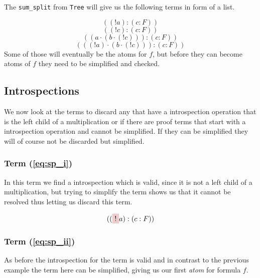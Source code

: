 

The \texttt{sum\_split} from \texttt{Tree} will give us the following terms in form of a list. 

\begin{equation}\label{eq:sp_i}	
	((!a):(c:F))
\end{equation}
\begin{equation}\label{eq:sp_ii}	
	((!c):(c:F))
\end{equation}	
\begin{equation}\label{eq:sp_iii}	
	((a \cdot(b\cdot (! c))):(c:F))											
\end{equation}
\begin{equation}\label{eq:sp_iv}	
	(((! a)\cdot(b\cdot (! c))):(c:F))												
\end{equation}
Some of those will eventually be the atoms for $f$, but before they can become atoms of $f$ they need to be simplified and checked.

\subsection{Introspections}
We now look at the terms to discard any that have a introspection operation that is the left child of a multiplication or if there are proof terms that start with a introspection operation and cannot be simplified. If they can be simplified they will of course not be discarded but simplified.

\subsubsection[First term]{Term (\ref{eq:sp_i})}
In this term we find a introspection which is valid, since it is not a left child of a multiplication, but trying to simplify the term shows us that it cannot be resolved thus letting us discard this term.

\begin{equation*}
	((\tikz[baseline]{\node[fill=red!20,anchor=base] (t1){$!$};}a):(c:F)) 
\end{equation*}

\subsubsection[Second term]{Term (\ref{eq:sp_ii})}
As before the introspection for the term is valid and in contrast to the previous example the term here can be simplified, giving us our first \emph{atom} for formula $f.$

